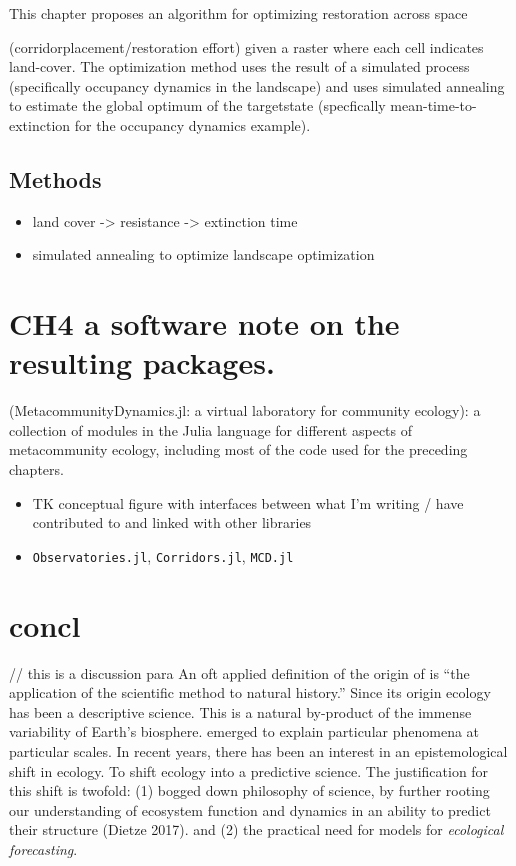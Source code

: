 \documentclass[10pt,oneside]{article}
\begin{document}
This chapter proposes an algorithm for optimizing restoration across
space

(corridorplacement/restoration effort) given a raster where each cell
indicates land-cover. The optimization method uses the result of a
simulated process (specifically occupancy dynamics in the landscape) and
uses simulated annealing to estimate the global optimum of the
targetstate (specfically mean-time-to-extinction for the occupancy
dynamics example).

\hypertarget{methods-2}{%
\subsection{Methods}\label{methods-2}}

\begin{itemize}
\tightlist
\item
  land cover -\textgreater{} resistance -\textgreater{} extinction time
\item
  simulated annealing to optimize landscape optimization
\end{itemize}

\hypertarget{ch4-a-software-note-on-the-resulting-packages.}{%
\section{CH4 a software note on the resulting
packages.}\label{ch4-a-software-note-on-the-resulting-packages.}}

(MetacommunityDynamics.jl: a virtual laboratory for community ecology):
a collection of modules in the Julia language for different aspects of
metacommunity ecology, including most of the code used for the preceding
chapters.

\begin{itemize}
\item
  TK conceptual figure with interfaces between what I'm writing / have
  contributed to and linked with other libraries
\item
  \texttt{Observatories.jl}, \texttt{Corridors.jl}, \texttt{MCD.jl}
\end{itemize}

\hypertarget{concl}{%
\section{concl}\label{concl}}

// this is a discussion para An oft applied definition of the origin of
is ``the application of the scientific method to natural history.''
Since its origin ecology has been a descriptive science. This is a
natural by-product of the immense variability of Earth's biosphere.
emerged to explain particular phenomena at particular scales. In recent
years, there has been an interest in an epistemological shift in
ecology. To shift ecology into a predictive science. The justification
for this shift is twofold: (1) bogged down philosophy of science, by
further rooting our understanding of ecosystem function and dynamics in
an ability to predict their structure (Dietze 2017). and (2) the
practical need for models for \emph{ecological forecasting}.
\end{document}
